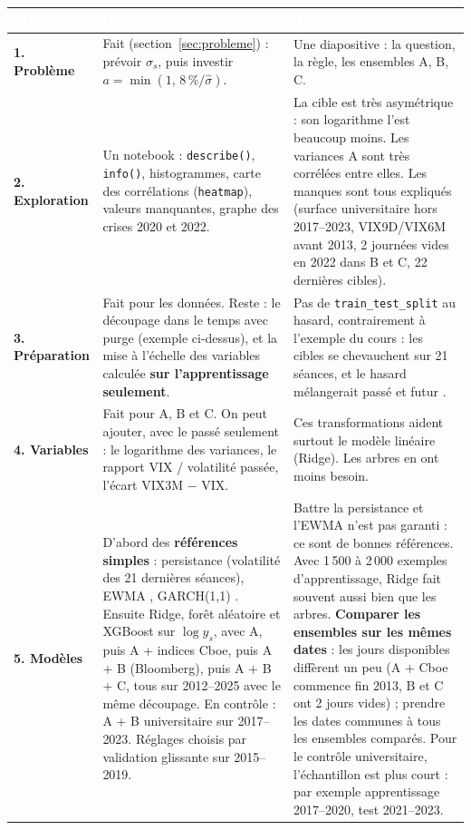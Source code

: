 \documentclass[10pt,a4paper]{article}
\newcommand{\entete}[1]{\textcolor{white}{\bfseries #1}}
\begin{document}
{\small
\begin{longtable}{@{}>{\leavevmode\bfseries\color{sarcelle}}p{2.1cm} L{7.6cm} L{7.2cm}@{}}
\entete{Étape} & \entete{Ce qu'il faut faire} & \entete{À quoi s'attendre} \\
. Problème & \textcolor{vert}{Fait} (section~\ref{sec:probleme}) : prévoir $\sigma_s$, puis investir $a=\min(1,\,8\,\%/\widehat\sigma)$. & Une diapositive : la question, la règle, les ensembles A, B, C. \\
2. Exploration & Un notebook : \texttt{describe()}, \texttt{info()}, histogrammes, carte des corrélations (\texttt{heatmap}), valeurs manquantes, graphe des crises 2020 et 2022. & La cible est très asymétrique : son logarithme l'est beaucoup moins. Les variances A sont très corrélées entre elles. Les manques sont tous expliqués (surface universitaire hors 2017–2023, VIX9D/VIX6M avant 2013, 2 journées vides en 2022 dans B et C, 22 dernières cibles). \\
3. Préparation & \textcolor{vert}{Fait} pour les données. Reste : le découpage dans le temps avec purge (exemple ci-dessus), et la mise à l'échelle des variables calculée \textbf{sur l'apprentissage seulement}. & Pas de \texttt{train\_test\_split} au hasard, contrairement à l'exemple du cours : les cibles se chevauchent sur 21 séances, et le hasard mélangerait passé et futur \cite{lopezdeprado}. \\
4. Variables & \textcolor{vert}{Fait} pour A, B et C. On peut ajouter, avec le passé seulement : le logarithme des variances, le rapport VIX / volatilité passée, l'écart VIX3M $-$ VIX. & Ces transformations aident surtout le modèle linéaire (Ridge). Les arbres en ont moins besoin. \\
5. Modèles & D'abord des \textbf{références simples} : persistance (volatilité des 21 dernières séances), EWMA \cite{riskmetrics}, GARCH(1,1) \cite{bollerslev}. Ensuite Ridge, forêt aléatoire et XGBoost sur $\log y_s$, avec A, puis A + indices Cboe, puis A + B (Bloomberg), puis A + B + C, tous sur 2012–2025 avec le même découpage. En contrôle : A + B universitaire sur 2017–2023. Réglages choisis par validation glissante sur 2015–2019. & Battre la persistance et l'EWMA n'est pas garanti : ce sont de bonnes références. Avec 1\,500 à 2\,000 exemples d'apprentissage, Ridge fait souvent aussi bien que les arbres. \textbf{Comparer les ensembles sur les mêmes dates} : les jours disponibles diffèrent un peu (A + Cboe commence fin 2013, B et C ont 2 jours vides) ; prendre les dates communes à tous les ensembles comparés. Pour le contrôle universitaire, l'échantillon est plus court : par exemple apprentissage 2017–2020, test 2021–2023. \\

\end{longtable}}
\end{document}

